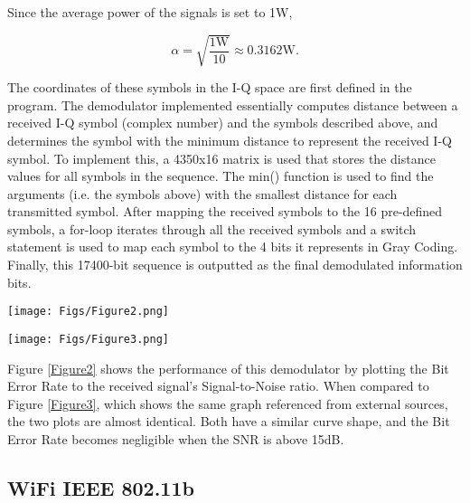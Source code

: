 \begin{flushleft}
Since the average power of the signals is set to 1W, 

\[
    \alpha = \sqrt{\frac{1\text{W}}{10}} \approx 0.3162\text{W}.
\]

The coordinates of these symbols in the I-Q space are first defined in the program.
The demodulator implemented essentially computes distance between a received I-Q symbol (complex number) and the symbols described above, and determines the symbol with the minimum distance to represent the received I-Q symbol. To implement this, a 4350x16 matrix is used that
stores the distance values for all symbols in the sequence. The min() function is used to find
the arguments (i.e. the symbols above) with the smallest distance for each transmitted
symbol. After mapping the received symbols to the 16 pre-defined symbols, a for-loop
iterates through all the received symbols and a switch statement is used to map each symbol
to the 4 bits it represents in Gray Coding. Finally, this 17400-bit sequence is outputted as the
final demodulated information bits.

\begin{center}
    \begin{minipage}{0.75\linewidth}
    \centering
    \texttt{[image: Figs/Figure2.png]}
    \label{Figure2}
    \end{minipage} \break
\end{center}

\begin{center}
    \begin{minipage}{0.75\linewidth}
    \centering
    \texttt{[image: Figs/Figure3.png]}
    \label{Figure3}
    \end{minipage} \break
\end{center}

Figure \ref{Figure2} shows the performance of this demodulator by plotting the Bit Error Rate to the
received signal’s Signal-to-Noise ratio. When compared to Figure \ref{Figure3}, which shows the same
graph referenced from external sources, the two plots are almost identical. Both have a
similar curve shape, and the Bit Error Rate becomes negligible when the SNR is above 15dB.


\subsection*{WiFi IEEE 802.11b}


\end{flushleft}
